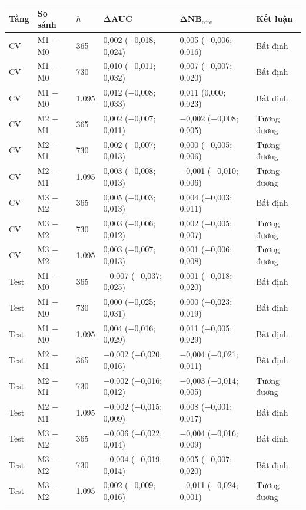 \begin{tabular}{@{}llllll@{}}
\toprule
Tầng & So sánh & $h$ & ΔAUC & ΔNB$_{\text{core}}$ & Kết luận\\
\midrule
CV & M1 − M0 & 365 & 0,002 (−0,018; 0,024) & 0,005 (−0,006; 0,016) & Bất định\\
CV & M1 − M0 & 730 & 0,010 (−0,011; 0,032) & 0,007 (−0,007; 0,020) & Bất định\\
CV & M1 − M0 & 1.095 & 0,012 (−0,008; 0,033) & 0,011 (0,000; 0,023) & Bất định\\
CV & M2 − M1 & 365 & 0,002 (−0,007; 0,011) & −0,002 (−0,008; 0,005) & Tương đương\\
CV & M2 − M1 & 730 & 0,002 (−0,007; 0,013) & 0,000 (−0,005; 0,006) & Tương đương\\
CV & M2 − M1 & 1.095 & 0,003 (−0,008; 0,013) & −0,001 (−0,010; 0,006) & Tương đương\\
CV & M3 − M2 & 365 & 0,005 (−0,003; 0,013) & 0,004 (−0,003; 0,011) & Bất định\\
CV & M3 − M2 & 730 & 0,003 (−0,006; 0,012) & 0,002 (−0,005; 0,007) & Tương đương\\
CV & M3 − M2 & 1.095 & 0,003 (−0,007; 0,013) & 0,001 (−0,006; 0,008) & Tương đương\\
\midrule
Test & M1 − M0 & 365 & −0,007 (−0,037; 0,025) & 0,001 (−0,018; 0,020) & Bất định\\
Test & M1 − M0 & 730 & 0,000 (−0,025; 0,031) & 0,000 (−0,023; 0,019) & Bất định\\
Test & M1 − M0 & 1.095 & 0,004 (−0,016; 0,029) & 0,011 (−0,005; 0,029) & Bất định\\
Test & M2 − M1 & 365 & −0,002 (−0,020; 0,016) & −0,004 (−0,021; 0,011) & Bất định\\
Test & M2 − M1 & 730 & −0,002 (−0,016; 0,012) & −0,003 (−0,014; 0,005) & Tương đương\\
Test & M2 − M1 & 1.095 & −0,002 (−0,015; 0,009) & 0,008 (−0,001; 0,017) & Bất định\\
Test & M3 − M2 & 365 & −0,006 (−0,022; 0,014) & −0,004 (−0,016; 0,009) & Bất định\\
Test & M3 − M2 & 730 & −0,004 (−0,019; 0,014) & 0,005 (−0,007; 0,020) & Bất định\\
Test & M3 − M2 & 1.095 & 0,002 (−0,009; 0,016) & −0,011 (−0,024; 0,001) & Tương đương\\
\bottomrule
\end{tabular}
